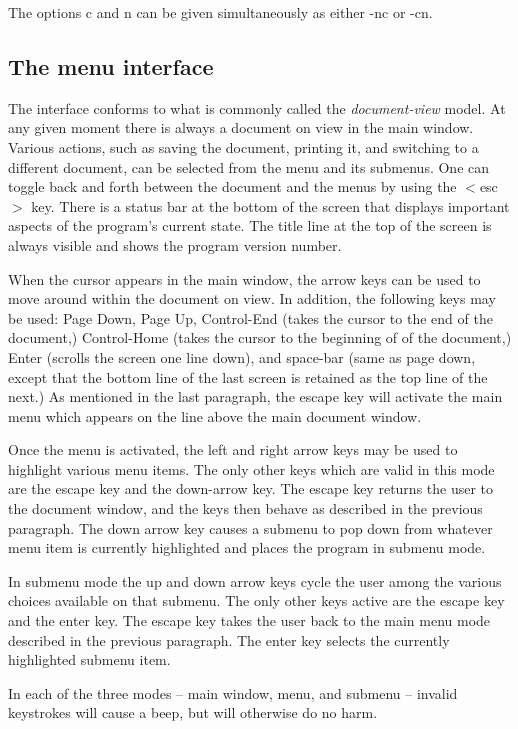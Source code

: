 The options c and n can be given simultaneously as either -nc or -cn. 

\subsection{The menu interface}

The interface conforms to what is commonly called the {\it document-view}
model. At any given moment there is always a document on view in the main
window. Various actions, such as saving the document, printing it, and
switching to a different document, can be selected from the menu and its
submenus. One can toggle back and forth between the document and the menus
by using the $<$esc$>$ key. There is a status bar at the bottom of the screen
that displays important aspects of the program's current state. The title
line at the top of the screen is always visible and shows the program
version number. 

When the cursor appears in the main window, the arrow keys can be used to
move around within the document on view. In addition, the following keys
may  be used: Page Down, Page Up, Control-End (takes the cursor to
the end of the document,) Control-Home (takes the cursor to the beginning of
of the document,) Enter (scrolls the screen one line down), and space-bar
(same as page down, except that the bottom line of the last screen is
retained as the top line of the next.) As mentioned in the last paragraph,
the escape key will activate the main menu which appears on the line
above the main document window. 

Once the menu is activated, the left and right arrow keys may be used to 
highlight various menu items. The only other keys which are valid in this mode are the escape key and the down-arrow key. The escape key returns the user
to the document window, and the keys then behave as described in the previous
paragraph. The down arrow key causes a submenu to pop down from whatever
menu item is currently highlighted and places the program in submenu mode.

In submenu mode the up and down arrow keys cycle the user among the various
choices available on that submenu. The only other keys active are the
escape key and the enter key. The escape key takes the user back to the
main menu mode described in the previous paragraph. The enter key selects
the currently highlighted submenu item. 

In each of the three modes -- main window, menu, and submenu -- invalid
keystrokes will cause a beep, but will otherwise do no harm. 

